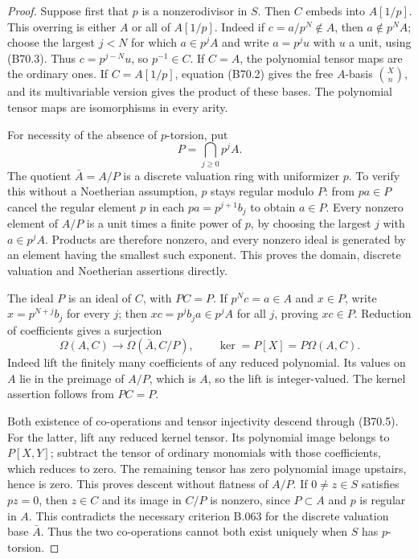\begin{proof}
Suppose first that $p$ is a nonzerodivisor in $S$. Then $C$ embeds into
$A[1/p]$. This overring is either $A$ or all of $A[1/p]$.
Indeed if $c=a/p^N\notin A$, then $a\notin p^NA$; choose the largest
$j<N$ for which $a\in p^jA$ and write $a=p^ju$ with $u$ a unit, using
(B70.3). Thus $c=p^{j-N}u$, so $p^{-1}\in C$.
If $C=A$, the polynomial tensor maps are the ordinary ones.
If $C=A[1/p]$, equation (B70.2) gives the free $A$-basis
$\binom X n$, and its multivariable version gives the product of these
bases. The polynomial tensor maps are isomorphisms in every arity.

For necessity of the absence of $p$-torsion, put
\[
                          P=\bigcap_{j\ge0}p^jA.
\]
The quotient $\bar A=A/P$ is a discrete valuation ring with uniformizer
$p$. To verify this without a Noetherian assumption, $p$ stays regular
modulo $P$: from $pa\in P$ cancel the regular element $p$ in each
$pa=p^{j+1}b_j$ to obtain $a\in P$. Every nonzero element of $A/P$ is a
unit times a finite power of $p$, by choosing the largest $j$ with
$a\in p^jA$. Products are therefore nonzero, and every nonzero ideal is
generated by an element having the smallest such exponent. This proves
the domain, discrete valuation and Noetherian assertions directly.

The ideal $P$ is an ideal of $C$, with $PC=P$. If $p^Nc=a\in A$ and
$x\in P$, write $x=p^{N+j}b_j$ for every $j$; then
$xc=p^jb_ja\in p^jA$ for all $j$, proving $xc\in P$.
Reduction of coefficients gives a surjection
\[
 \Omega(A,C)\longrightarrow\Omega(\bar A,C/P),\qquad
 \ker=P[X]=P\Omega(A,C).                                  \tag{B70.5}
\]
Indeed lift the finitely many coefficients of any reduced polynomial.
Its values on $A$ lie in the preimage of $A/P$, which is $A$, so the
lift is integer-valued. The kernel assertion follows from $PC=P$.

Both existence of co-operations and tensor injectivity descend through
(B70.5). For the latter, lift any reduced kernel tensor. Its polynomial
image belongs to $P[X,Y]$; subtract the tensor of ordinary monomials
with those coefficients, which reduces to zero. The remaining tensor
has zero polynomial image upstairs, hence is zero. This proves descent
without flatness of $A/P$.
If $0\ne z\in S$ satisfies $pz=0$, then $z\in C$ and its image in $C/P$
is nonzero, since $P\subset A$ and $p$ is regular in $A$. This contradicts
the necessary criterion B.063 for the discrete valuation base $\bar A$.
Thus the two co-operations cannot both exist uniquely when $S$ has
$p$-torsion.


\end{proof}
